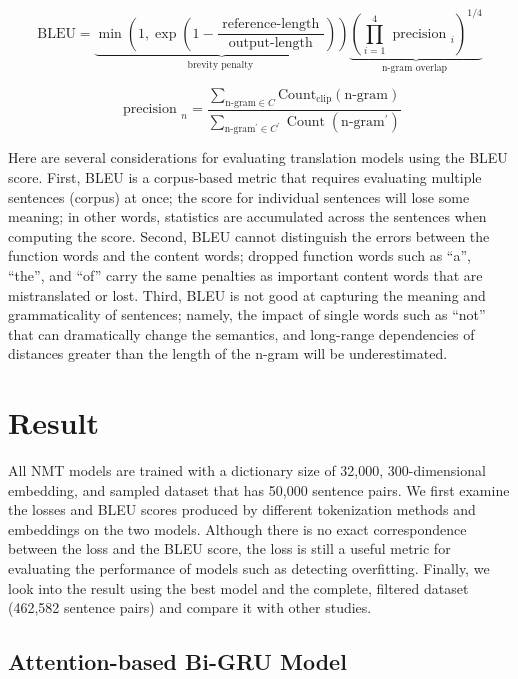 \begin{equation}
    \mathrm{BLEU}=\underbrace{\min \left(1, \exp \left(1-\frac{\text { reference-length }}{\text { output-length }}\right)\right)}_{\text {brevity penalty }} \underbrace{\left(\prod_{i=1}^{4} \text { precision }_{i}\right)^{1 / 4}}_{\text {n-gram overlap }} \label{eq:eq16}
\end{equation}

\begin{equation}
    \text { precision }_{n} = \frac{\sum_{ \text {n-gram} \in C} \text {Count}_{\text {clip}}(\text {n-gram})}{\sum_{\text{n-gram}^{\prime} \in C^{\prime}} \operatorname{Count}\left(\text{n-gram}^{\prime}\right)} \label{eq:eq17}
\end{equation}

Here are several considerations for evaluating translation models using the BLEU score. First, BLEU is a corpus-based metric that requires evaluating multiple sentences (corpus) at once; the score for individual sentences will lose some meaning; in other words, statistics are accumulated across the sentences when computing the score. Second, BLEU cannot distinguish the errors between the function words and the content words; dropped function words such as ``a'', ``the'', and ``of'' carry the same penalties as important content words that are mistranslated or lost. Third, BLEU is not good at capturing the meaning and grammaticality of sentences; namely, the impact of single words such as ``not'' that can dramatically change the semantics, and long-range dependencies of distances greater than the length of the n-gram will be underestimated.

\section{Result} \label{sec:result}

All NMT models are trained with a dictionary size of 32,000, 300-dimensional embedding, and sampled dataset that has 50,000 sentence pairs. We first examine the losses and BLEU scores produced by different tokenization methods and embeddings on the two models. Although there is no exact correspondence between the loss and the BLEU score, the loss is still a useful metric for evaluating the performance of models such as detecting overfitting. Finally, we look into the result using the best model and the complete, filtered dataset (462,582 sentence pairs) and compare it with other studies.

\subsection{Attention-based Bi-GRU Model}

